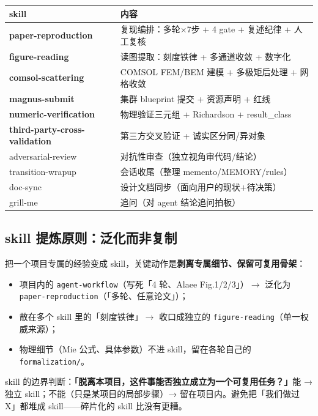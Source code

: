 \begin{table}[H]
\centering\small
\begin{tabular}{@{}p{4.6cm}p{7.6cm}@{}}
\toprule
skill & 内容 \\
\midrule
\textbf{paper-reproduction} & 复现编排：多轮×7步 + 4 gate + 复述纪律 + 人工复核 \\
\textbf{figure-reading} & 读图提取：刻度铁律 + 多通道收敛 + 数字化 \\
\textbf{comsol-scattering} & COMSOL FEM/BEM 建模 + 多极矩后处理 + 网格收敛 \\
\textbf{magnus-submit} & 集群 blueprint 提交 + 资源声明 + 红线 \\
\textbf{numeric-verification} & 物理验证三元组 + Richardson + result\_class \\
\textbf{third-party-cross-validation} & 第三方交叉验证 + 诚实区分同/异对象 \\
\midrule
adversarial-review & 对抗性审查（独立视角审代码/结论） \\
transition-wrapup & 会话收尾（整理 memento/MEMORY/rules） \\
doc-sync & 设计文档同步（面向用户的现状+待决策） \\
grill-me & 追问（对 agent 结论追问拍板） \\
\bottomrule
\end{tabular}
\end{table}

\subsection{skill 提炼原则：泛化而非复制}

把一个项目专属的经验变成 skill，关键动作是\textbf{剥离专属细节、保留可复用骨架}：

\begin{itemize}
  \item 项目内的 \texttt{agent-workflow}（写死「4 轮、Alaee Fig.1/2/3」）$\to$ 泛化为 \texttt{paper-reproduction}（「多轮、任意论文」）；
  \item 散在多个 skill 里的「刻度铁律」$\to$ 收口成独立的 \texttt{figure-reading}（单一权威来源）；
  \item 物理细节（Mie 公式、具体参数）不进 skill，留在各轮自己的 \texttt{formalization/}。
\end{itemize}

\begin{important}
skill 的边界判断：\textbf{「脱离本项目，这件事能否独立成立为一个可复用任务？」}能 → 独立 skill；不能（只是某项目的局部步骤）→ 留在项目内。避免把「我们做过 X」都堆成 skill——碎片化的 skill 比没有更糟。
\end{important}
